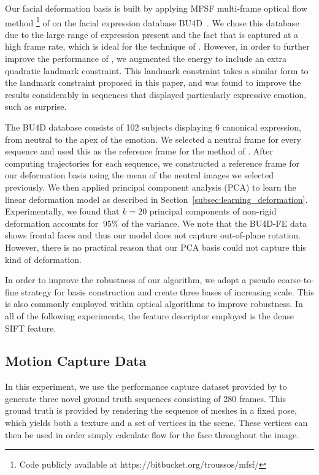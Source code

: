 Our facial deformation basis is built by applying MFSF multi-frame optical flow method
\footnote{Code publicly available at https://bitbucket.org/troussos/mfsf/} of \citet{garg2013variational} on
the facial expression database BU4D~\cite{yin2008high}. We chose this database due
to the large range of expression present and the fact that is captured at a high
frame rate, which is ideal for the technique of \citet{garg2013variational}. However, in order
to further improve the performance of \citet{garg2013variational}, we augmented the energy
to include an extra quadratic landmark constraint. This landmark constraint
takes a similar form to the landmark constraint proposed in this paper, and was
found to improve the results considerably in sequences that displayed particularly
expressive emotion, such as surprise.

The BU4D database consists of 102 subjects displaying 6 canonical expression,
from neutral to the apex of the emotion. We selected a neutral frame for every
sequence and used this as the reference frame for the method of \citet{garg2013variational}.
After computing trajectories for each sequence,
we constructed a reference frame for our deformation basis using the mean
of the neutral images we selected previously. We then applied principal
component analysis (PCA) to learn the linear deformation model as described in Section~\ref{subsec:learning_deformation}.
Experimentally, we found that $k=20$ principal components of
non-rigid deformation accounts for $~95\%$ of the variance.
We note that the BU4D-FE data shows frontal faces and thus our model does not capture out-of-plane
rotation. However, there is no practical reason that our PCA basis could not capture
this kind of deformation.

In order to improve the robustness of our algorithm, we adopt a pseudo coarse-to-fine
strategy for basis construction and create three bases of increasing scale. This is also
commonly employed within optical algorithms to improve robustness. In all of the following experiments,
the feature descriptor employed is the dense SIFT feature.
\subsection{Motion Capture Data}\label{subsec:experiments_mocap}
In this experiment, we use the performance capture dataset provided by \citet{zhang2004spacetime}
to generate three novel ground truth sequences consisting of 280 frames. This ground truth is provided by rendering
the sequence of meshes in a fixed pose, which yields both a texture and a set of vertices
in the scene. These vertices can then be used in order simply calculate flow for the face
throughout the image.


